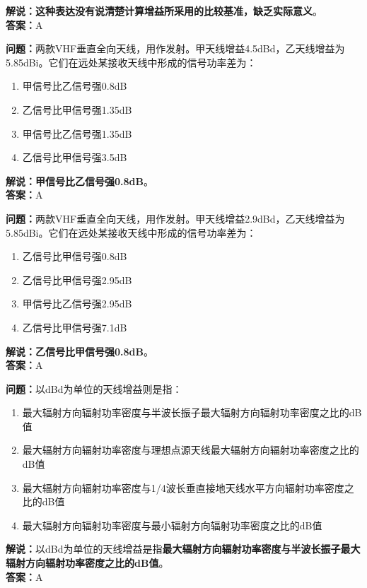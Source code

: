 \textbf{解说：这种表达没有说清楚计算增益所采用的比较基准，缺乏实际意义}。\\\textbf{答案：}A



\textbf{问题：}两款VHF垂直全向天线，用作发射。甲天线增益4.5dBd，乙天线增益为5.85dBi。它们在远处某接收天线中形成的信号功率差为：

\begin{enumerate}[label=\Alph*), leftmargin=1cm]
	\item 甲信号比乙信号强0.8dB
	\item 乙信号比甲信号强1.35dB
	\item 甲信号比乙信号强1.35dB
	\item 乙信号比甲信号强3.5dB
\end{enumerate}

\textbf{解说：甲信号比乙信号强0.8dB}。\\\textbf{答案：}A%



\textbf{问题：}两款VHF垂直全向天线，用作发射。甲天线增益2.9dBd，乙天线增益为5.85dBi。它们在远处某接收天线中形成的信号功率差为：

\begin{enumerate}[label=\Alph*), leftmargin=1cm]
	\item 乙信号比甲信号强0.8dB
	\item 乙信号比甲信号强2.95dB
	\item 甲信号比乙信号强2.95dB
	\item 乙信号比甲信号强7.1dB
\end{enumerate}

\textbf{解说：乙信号比甲信号强0.8dB}。\\\textbf{答案：}A



\textbf{问题：}以dBd为单位的天线增益则是指：

\begin{enumerate}[label=\Alph*), leftmargin=1cm]
	\item 最大辐射方向辐射功率密度与半波长振子最大辐射方向辐射功率密度之比的dB值
	\item 最大辐射方向辐射功率密度与理想点源天线最大辐射方向辐射功率密度之比的dB值
	\item 最大辐射方向辐射功率密度与1/4波长垂直接地天线水平方向辐射功率密度之比的dB值
	\item 最大辐射方向辐射功率密度与最小辐射方向辐射功率密度之比的dB值
\end{enumerate}

\textbf{解说：}以dBd为单位的天线增益是指\textbf{最大辐射方向辐射功率密度与半波长振子最大辐射方向辐射功率密度之比的dB值}。\\\textbf{答案：}A



